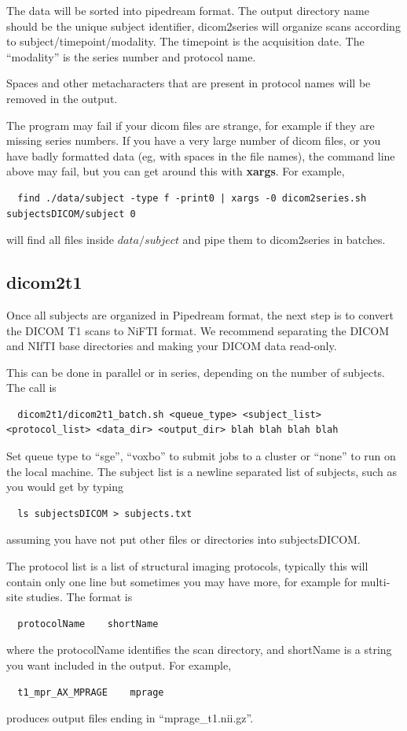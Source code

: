\documentclass{InsightArticle}
\begin{document}
The data will be sorted into pipedream format. The output directory name should be the unique subject identifier, dicom2series will organize scans according to subject/timepoint/modality. The timepoint is the acquisition date. The ``modality'' is the series number and protocol name. 

Spaces and other metacharacters that are present in protocol names will be removed in the output.

The program may fail if your dicom files are strange, for example if they are missing series numbers. If you have a very large number of dicom files, or you have badly formatted data (eg, with spaces in the file names), the command line above may fail, but you can get around this with \textbf{xargs}. For example,
\begin{verbatim}
  find ./data/subject -type f -print0 | xargs -0 dicom2series.sh subjectsDICOM/subject 0
\end{verbatim}
will find all files inside $data/subject$ and pipe them to dicom2series in batches. 


\subsection{dicom2t1}

Once all subjects are organized in Pipedream format, the next step is to convert the DICOM T1 scans to NiFTI format. We recommend separating the DICOM and NIfTI base directories and making your DICOM data read-only.

This can be done in parallel or in series, depending on the number of subjects. The call is
\begin{lstlisting}
  dicom2t1/dicom2t1_batch.sh <queue_type> <subject_list> <protocol_list> <data_dir> <output_dir> blah blah blah blah 
\end{lstlisting}
Set queue type to ``sge'', ``voxbo'' to submit jobs to a cluster or ``none'' to run on the local machine. The subject list
is a newline separated list of subjects, such as you would get by typing
\begin{verbatim}
  ls subjectsDICOM > subjects.txt
\end{verbatim}
assuming you have not put other files or directories into subjectsDICOM.

The protocol list is a list of structural imaging protocols, typically this will contain only one line but sometimes
you may have more, for example for multi-site studies. The format is
\begin{verbatim}
  protocolName    shortName
\end{verbatim}
where the protocolName identifies the scan directory, and shortName is a string you want included in the output. For example,
\begin{verbatim}
  t1_mpr_AX_MPRAGE    mprage
\end{verbatim}
produces output files ending in ``mprage\_t1.nii.gz''. 
\end{document}
